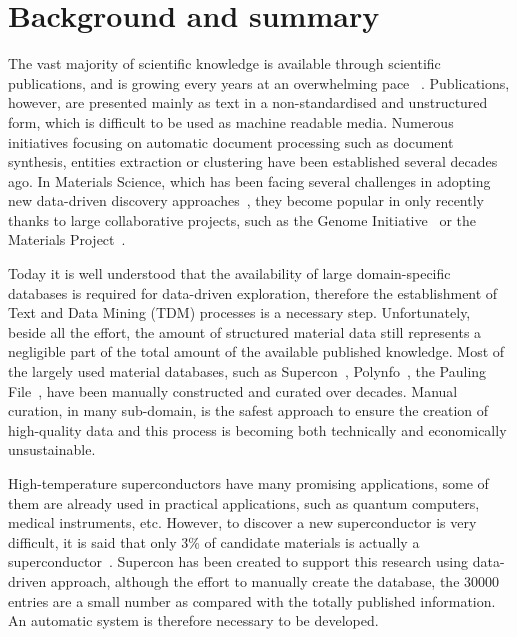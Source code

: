 \documentclass[a4paper,10pt]{article}
\begin{document}
\section{Background and summary}
The vast majority of scientific knowledge is available through scientific publications, and is growing every years at an overwhelming pace~\cite{Grigas2017JustGI} \cite{Khabsa2014TheNO} \cite{OrduaMalea2015MethodsFE} \cite{Bjrk2009ScientificJP}. 
Publications, however, are presented mainly as text in a non-standardised and unstructured form, which is difficult to be used as machine readable media. 
Numerous initiatives focusing on automatic document processing such as document synthesis, entities extraction or clustering have been established several decades ago. 
In Materials Science, which has been facing several challenges in adopting new data-driven discovery approaches~\cite{Hill2016MaterialsSW}, they become popular in only recently thanks to large collaborative projects, such as the Genome Initiative~\cite{material_genome_initiative} or the Materials Project~\cite{Jain2013CommentaryTM_materialsProject}. 

Today it is well understood that the availability of large domain-specific databases is required for data-driven exploration, therefore the establishment of Text and Data Mining (TDM) processes is a necessary step.
Unfortunately, beside all the effort, the amount of structured material data still represents a negligible part of the total amount of the available published knowledge.
Most of the largely used material databases, such as Supercon~\cite{SuperCon}, Polynfo~\cite{polynfo}, the Pauling File~\cite{Blokhin2018ThePF_paulingFile}, have been manually constructed and curated over decades. Manual curation, in many sub-domain, is the safest approach to ensure the creation of high-quality data and this process is becoming both technically and economically unsustainable. 


High-temperature superconductors have many promising applications, some of them are already used in practical applications, such as quantum computers, medical instruments, etc. However, to discover a new superconductor is very difficult, it is said that only 3\% of candidate materials is actually a superconductor~\cite{Konno2018DeepLO}.
Supercon has been created to support this research using data-driven approach, although the effort to manually create the database, the 30000 entries are a small number as compared with the totally published information. 
An automatic system is therefore necessary to be developed. 
\end{document}
